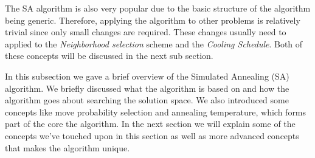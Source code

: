 The SA algorithm is also very popular due to the basic structure of the algorithm being generic\cite{VariousCoolingSA}. Therefore, applying the algorithm to other problems is relatively trivial since only small changes are required. These changes usually need to applied to the \emph{Neighborhood selection} scheme and the \emph{Cooling Schedule}\cite{VariousCoolingSA,DormRoomSA}. Both of these concepts will be discussed in the next sub section.

In this subsection we gave a brief overview of the Simulated Annealing (SA) algorithm. We briefly discussed what the algorithm is based on and how the algorithm goes about searching the solution space. We also introduced some concepts like move probability selection and annealing temperature, which forms part of the core the algorithm. In the next section we will explain some of the concepts we've touched upon in this section as well as more advanced concepts that makes the algorithm unique.
